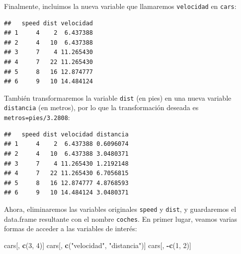 \documentclass[
]{book}
\newenvironment{Shaded}{\begin{snugshade}}{\end{snugshade}}
\newcommand{\DecValTok}[1]{\textcolor[rgb]{0.00,0.00,0.81}{#1}}
\newcommand{\FloatTok}[1]{\textcolor[rgb]{0.00,0.00,0.81}{#1}}
\newcommand{\FunctionTok}[1]{\textcolor[rgb]{0.13,0.29,0.53}{\textbf{#1}}}
\newcommand{\NormalTok}[1]{#1}
\newcommand{\OtherTok}[1]{\textcolor[rgb]{0.56,0.35,0.01}{#1}}
\newcommand{\SpecialCharTok}[1]{\textcolor[rgb]{0.81,0.36,0.00}{\textbf{#1}}}
\newcommand{\StringTok}[1]{\textcolor[rgb]{0.31,0.60,0.02}{#1}}
\theoremstyle{break}
\theoremstyle{nonumberplain}
\begin{document}
Finalmente, incluimos la nueva variable que llamaremos
\texttt{velocidad} en \texttt{cars}:

\begin{Shaded}
\end{Shaded}

\begin{verbatim}
##   speed dist velocidad
## 1     4    2  6.437388
## 2     4   10  6.437388
## 3     7    4 11.265430
## 4     7   22 11.265430
## 5     8   16 12.874777
## 6     9   10 14.484124
\end{verbatim}

También transformaremos la variable \texttt{dist} (en pies) en una nueva
variable \texttt{distancia} (en metros), por lo que la transformación deseada es
\texttt{metros=pies/3.2808}:

\begin{Shaded}
\end{Shaded}

\begin{verbatim}
##   speed dist velocidad distancia
## 1     4    2  6.437388 0.6096074
## 2     4   10  6.437388 3.0480371
## 3     7    4 11.265430 1.2192148
## 4     7   22 11.265430 6.7056815
## 5     8   16 12.874777 4.8768593
## 6     9   10 14.484124 3.0480371
\end{verbatim}

Ahora, eliminaremos las variables originales \texttt{speed} y
\texttt{dist}, y guardaremos el data.frame resultante con el nombre \texttt{coches}.
En primer lugar, veamos varias formas de acceder a las variables de
interés:

\begin{Shaded}
\begin{Highlighting}[]
\NormalTok{cars[, }\FunctionTok{c}\NormalTok{(}\DecValTok{3}\NormalTok{, }\DecValTok{4}\NormalTok{)]}
\NormalTok{cars[, }\FunctionTok{c}\NormalTok{(}\StringTok{"velocidad"}\NormalTok{, }\StringTok{"distancia"}\NormalTok{)]}
\NormalTok{cars[, }\SpecialCharTok{{-}}\FunctionTok{c}\NormalTok{(}\DecValTok{1}\NormalTok{, }\DecValTok{2}\NormalTok{)]}
\end{Highlighting}
\end{Shaded}
\end{document}
